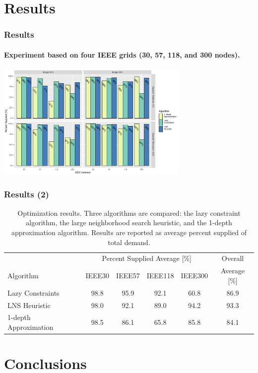 \documentclass{beamer}
\begin{document}
\section{Results}
\begin{frame}
\frametitle{Results}
\framesubtitle{Experiment based on four IEEE grids (30, 57, 118, and 300 nodes).}
\footnotesize
\includegraphics[width=0.7\textwidth]{Aux_files/12hour_instance_results.pdf}
\end{frame}
\begin{frame}
\frametitle{Results (2)}
\begin{table}%
\center
\begin{tabular}{lccccc}
 & \multicolumn{4}{c}{Percent Supplied Average [\%]} & Overall\\
Algorithm & IEEE30 & IEEE57 & IEEE118 & IEEE300 & Average [\%]\\ \toprule
Lazy Constraints & 98.8 & 95.9 & 92.1 & 60.8 & 86.9\\ \midrule
LNS Heuristic & 98.0 & 92.1 & 89.0 & 94.2 & 93.3\\ \midrule
1-depth Approximation & 98.5 & 86.1 & 65.8 & 85.8 & 84.1 \\ \bottomrule
\end{tabular}
\caption{Optimization results. Three algorithms are compared: the lazy constraint algorithm, the large neighborhood search heuristic, and the 1-depth approximation algorithm. Results are reported as average percent supplied of total demand.}
\label{tab:results_algo_compare}
\end{table}
\end{frame}


\section{Conclusions}
\end{document}

